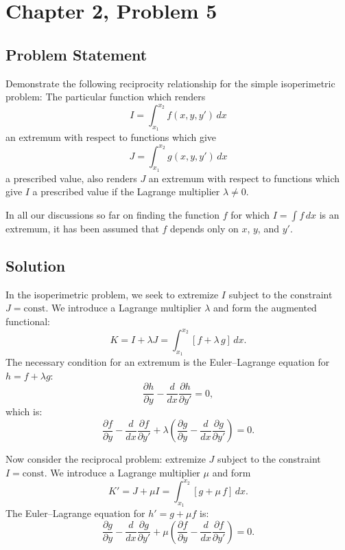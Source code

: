 \documentclass[12pt]{article}
\begin{document}
\section*{Chapter 2, Problem 5}

\subsection*{Problem Statement}
Demonstrate the following reciprocity relationship for the simple isoperimetric problem: The particular function which renders
\[
  I = \int_{x_1}^{x_2} f(x, y, y')\,dx
\]
an extremum with respect to functions which give
\[
  J = \int_{x_1}^{x_2} g(x, y, y')\,dx
\]
a prescribed value, also renders $J$ an extremum with respect to functions which give $I$ a prescribed value if the Lagrange multiplier $\lambda \neq 0$.

In all our discussions so far on finding the function $f$ for which $I = \int f\,dx$ is an extremum, it has been assumed that $f$ depends only on $x$, $y$, and $y'$.

\subsection*{Solution}

In the isoperimetric problem, we seek to extremize $I$ subject to the constraint $J = \text{const}$. We introduce a Lagrange multiplier $\lambda$ and form the augmented functional:
\[
  K = I + \lambda J = \int_{x_1}^{x_2} [f + \lambda\,g]\,dx.
\]
The necessary condition for an extremum is the Euler--Lagrange equation for $h = f + \lambda g$:
\[
  \frac{\partial h}{\partial y} - \frac{d}{dx}\frac{\partial h}{\partial y'} = 0,
\]
which is:
\begin{equation}
  \frac{\partial f}{\partial y} - \frac{d}{dx}\frac{\partial f}{\partial y'} + \lambda\left(\frac{\partial g}{\partial y} - \frac{d}{dx}\frac{\partial g}{\partial y'}\right) = 0. \tag{1}
\end{equation}

Now consider the reciprocal problem: extremize $J$ subject to the constraint $I = \text{const}$. We introduce a Lagrange multiplier $\mu$ and form
\[
  K' = J + \mu I = \int_{x_1}^{x_2} [g + \mu\,f]\,dx.
\]
The Euler--Lagrange equation for $h' = g + \mu f$ is:
\begin{equation}
  \frac{\partial g}{\partial y} - \frac{d}{dx}\frac{\partial g}{\partial y'} + \mu\left(\frac{\partial f}{\partial y} - \frac{d}{dx}\frac{\partial f}{\partial y'}\right) = 0. \tag{2}
\end{equation}
\end{document}
